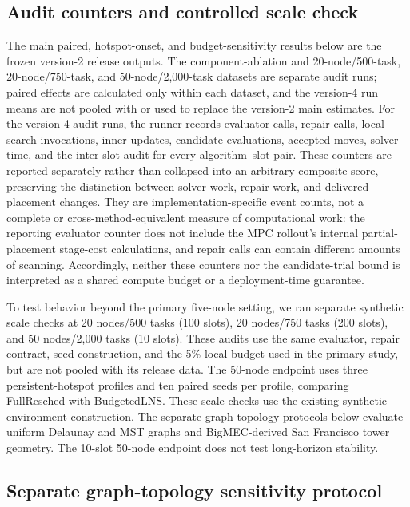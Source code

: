 \documentclass[preprint,12pt]{elsarticle}
\begin{document}
\subsection{Audit counters and controlled scale check}\label{audit-counters-and-scale-check}

The main paired, hotspot-onset, and budget-sensitivity results below are the
frozen version-2 release outputs. The component-ablation and 20-node/500-task, 20-node/750-task, and
50-node/2,000-task datasets are separate audit runs; paired effects are calculated only
within each dataset, and the version-4 run means are not pooled with or used to
replace the version-2 main estimates. For the version-4 audit runs, the runner
records evaluator calls, repair calls, local-search invocations, inner updates,
candidate evaluations, accepted moves, solver time, and the inter-slot audit
for every algorithm--slot pair. These counters are reported separately rather
than collapsed into an arbitrary composite score, preserving the distinction
between solver work, repair work, and delivered placement changes.
They are implementation-specific event counts, not a complete or
cross-method-equivalent measure of computational work: the reporting
evaluator counter does not include the MPC rollout's internal
partial-placement stage-cost calculations, and repair calls can contain
different amounts of scanning. Accordingly, neither these counters nor the
candidate-trial bound is interpreted as a shared compute budget or a
deployment-time guarantee.

To test behavior beyond the primary five-node setting, we ran separate
synthetic scale checks at 20 nodes/500 tasks (100 slots), 20 nodes/750 tasks
(200 slots), and 50 nodes/2,000 tasks (10 slots). These audits use the same
evaluator, repair contract, seed construction, and the 5\% local budget used in the
primary study, but are not pooled with its release data. The 50-node endpoint
uses three persistent-hotspot profiles and ten paired seeds per profile,
comparing FullResched with BudgetedLNS. These scale checks use the existing
synthetic environment construction. The separate graph-topology protocols below
evaluate uniform Delaunay and MST graphs and BigMEC-derived San Francisco
tower geometry. The 10-slot 50-node endpoint does not test long-horizon
stability.

\subsection{Separate graph-topology sensitivity protocol}\label{graph-topology-sensitivity-protocol}
\end{document}
